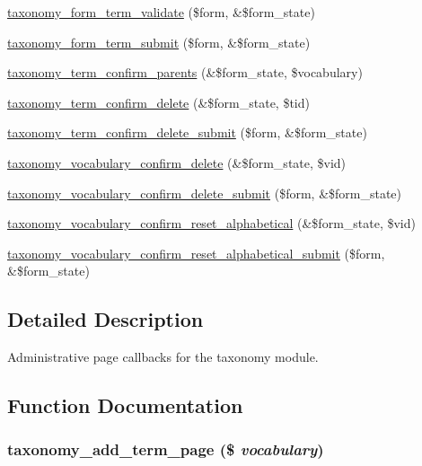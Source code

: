 \begin{CompactItemize}
\item 
\hyperlink{taxonomy_8admin_8inc_b8a69acec84eb6217604c066b33deab1}{taxonomy\_\-form\_\-term\_\-validate} (\$form, \&\$form\_\-state)
\item 
\hyperlink{taxonomy_8admin_8inc_47414380bfb0caa70eb3d35a7e153ac0}{taxonomy\_\-form\_\-term\_\-submit} (\$form, \&\$form\_\-state)
\item 
\hyperlink{group__forms_gc82e5e08d7d2fb7ce069411512dbc524}{taxonomy\_\-term\_\-confirm\_\-parents} (\&\$form\_\-state, \$vocabulary)
\item 
\hyperlink{group__forms_g409c50f3f4727ec2856079e7abb01eba}{taxonomy\_\-term\_\-confirm\_\-delete} (\&\$form\_\-state, \$tid)
\item 
\hyperlink{taxonomy_8admin_8inc_b96dee24a79d706b4b28d26ceac5e946}{taxonomy\_\-term\_\-confirm\_\-delete\_\-submit} (\$form, \&\$form\_\-state)
\item 
\hyperlink{group__forms_gc5c29e41ed1c0a05b4678e69aff1d947}{taxonomy\_\-vocabulary\_\-confirm\_\-delete} (\&\$form\_\-state, \$vid)
\item 
\hyperlink{taxonomy_8admin_8inc_37c587803cac8e509913d1374e897040}{taxonomy\_\-vocabulary\_\-confirm\_\-delete\_\-submit} (\$form, \&\$form\_\-state)
\item 
\hyperlink{group__forms_g439f9d499952ff3647ffe0c660d0bd65}{taxonomy\_\-vocabulary\_\-confirm\_\-reset\_\-alphabetical} (\&\$form\_\-state, \$vid)
\item 
\hyperlink{taxonomy_8admin_8inc_682c533b8249e033ce7e612550c9b68d}{taxonomy\_\-vocabulary\_\-confirm\_\-reset\_\-alphabetical\_\-submit} (\$form, \&\$form\_\-state)
\end{CompactItemize}


\subsection{Detailed Description}
Administrative page callbacks for the taxonomy module. 

\subsection{Function Documentation}
\hypertarget{taxonomy_8admin_8inc_fc43b3075dc456fcc785d0aa4f65bd3d}{
\subsubsection[{taxonomy\_\-add\_\-term\_\-page}]{\setlength{\rightskip}{0pt plus 5cm}taxonomy\_\-add\_\-term\_\-page (\$ {\em vocabulary})}}
\label{taxonomy_8admin_8inc_fc43b3075dc456fcc785d0aa4f65bd3d}


